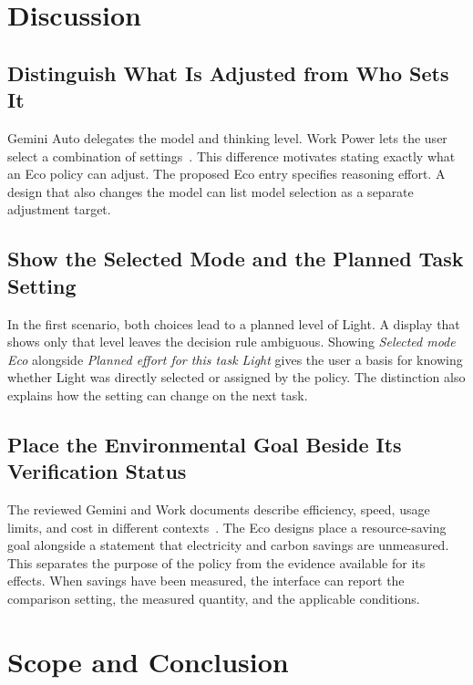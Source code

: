 \documentclass[11pt,letterpaper]{article}
\begin{document}
\section{Discussion}

\subsection{Distinguish What Is Adjusted from Who Sets It}

Gemini Auto delegates the model and thinking level. Work Power lets the
user select a combination of settings~\cite{google2026,openai2026}.
This difference motivates stating exactly what an Eco policy can
adjust. The proposed Eco entry specifies reasoning effort. A design
that also changes the model can list model selection as a separate
adjustment target.

\subsection{Show the Selected Mode and the Planned Task Setting}

In the first scenario, both choices lead to a planned level of Light.
A display that shows only that level leaves the decision rule
ambiguous. Showing \emph{Selected mode Eco} alongside \emph{Planned
effort for this task Light} gives the user a basis for knowing whether
Light was directly selected or assigned by the policy. The distinction
also explains how the setting can change on the next task.

\subsection{Place the Environmental Goal Beside Its Verification Status}

The reviewed Gemini and Work documents describe efficiency, speed,
usage limits, and cost in different contexts~\cite{google2026,openai2026}.
The Eco designs place a resource-saving goal alongside a statement
that electricity and carbon savings are unmeasured. This separates
the purpose of the policy from the evidence available for its effects.
When savings have been measured, the interface can report the
comparison setting, the measured quantity, and the applicable
conditions.

\section{Scope and Conclusion}
\end{document}
